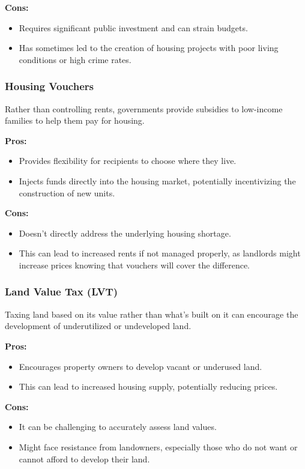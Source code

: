 \textbf{Cons:}
\begin{itemize}
    \item Requires significant public investment and can strain budgets.
    \item Has sometimes led to the creation of housing projects with poor living conditions or high crime rates.
\end{itemize}

\subsubsection*{Housing Vouchers}
Rather than controlling rents, governments provide subsidies to low-income families to help them pay for housing.

\textbf{Pros:}
\begin{itemize}
    \item Provides flexibility for recipients to choose where they live.
    \item Injects funds directly into the housing market, potentially incentivizing the construction of new units.
\end{itemize}

\textbf{Cons:}
\begin{itemize}
    \item Doesn't directly address the underlying housing shortage.
    \item This can lead to increased rents if not managed properly, as landlords might increase prices knowing that vouchers will cover the difference.
\end{itemize}

\subsubsection*{Land Value Tax (LVT)}
Taxing land based on its value rather than what's built on it can encourage the development of underutilized or undeveloped land.

\textbf{Pros:}
\begin{itemize}
    \item Encourages property owners to develop vacant or underused land.
    \item This can lead to increased housing supply, potentially reducing prices.
\end{itemize}

\textbf{Cons:}
\begin{itemize}
    \item It can be challenging to accurately assess land values.
    \item Might face resistance from landowners, especially those who do not want or cannot afford to develop their land.
\end{itemize}

